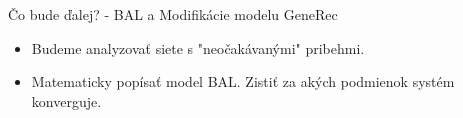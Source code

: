 \documentclass[xcolor=dvipsnames]{beamer}
\begin{document}
\begin{frame}{Čo bude ďalej? - BAL a Modifikácie modelu GeneRec}
  \begin{itemize}
    \item Budeme analyzovať siete s "neočakávanými" pribehmi. 
    \item Matematicky popísať model BAL. Zistiť za akých podmienok systém konverguje.         
  \end{itemize}
\end{frame}


\end{document}
